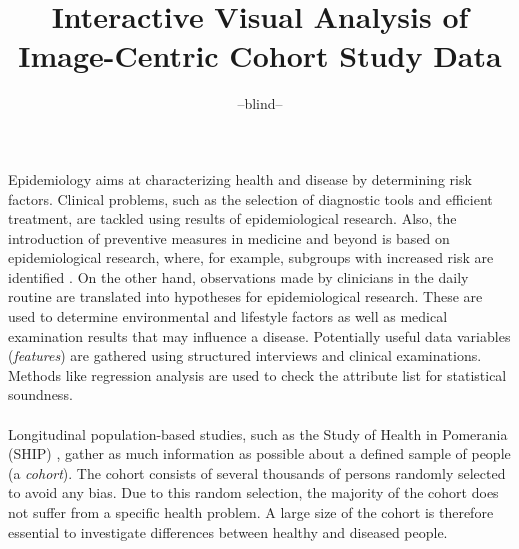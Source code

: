 \documentclass[journal]{style/vgtc} 			          %
\title{Interactive Visual Analysis of Image-Centric Cohort Study Data}
\author{--blind--}
\begin{document}


\maketitle

Epidemiology aims at characterizing health and disease by determining risk factors.
%
Clinical problems, such as the selection of diagnostic tools and efficient treatment, are tackled using results of epidemiological research.
%
Also, the introduction of preventive measures in medicine and beyond is based on epidemiological research, where, for example, subgroups with increased risk are identified \cite{Fletcher2012}.
%
On the other hand, observations made by clinicians in the daily routine are translated into hypotheses for epidemiological research.
%
These are used to determine environmental and lifestyle factors as well as medical examination results that may influence a disease.
%
Potentially useful data variables (\emph{features}) are gathered using structured interviews and clinical examinations.
%
Methods like regression analysis are used to check the attribute list for statistical soundness.
%
\\\\
Longitudinal population-based studies, such as the Study of Health in Pomerania (SHIP) \cite{Volzke2011}, gather as much information as possible about a defined sample of people (a \emph{cohort}).
%
The cohort consists of several thousands of persons randomly selected to avoid any bias.
%
Due to this random selection, the majority of the cohort does not suffer from a specific health problem.
%
A large size of the cohort is therefore essential to investigate differences between healthy and diseased people.
%
\end{document}
